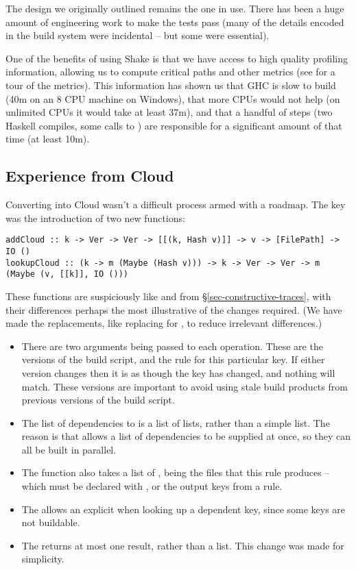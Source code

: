 The design we originally outlined remains the one in use. There has been a huge amount of engineering work to make the tests pass (many of the details encoded in the \Make build system were incidental -- but some were essential).

One of the benefits of using Shake is that we have access to high quality profiling information, allowing us to compute critical paths and other metrics (see \cite{mitchell2019ghcrebuildtimes} for a tour of the metrics). This information has shown us that GHC is slow to build (40m on an 8 CPU machine on Windows), that more CPUs would not help (on unlimited CPUs it would take at least 37m), and that a handful of steps (two Haskell compiles, some calls to ) are responsible for a significant amount of that time (at least 10m).

\subsection{Experience from Cloud \Shake}\label{sec-cloud-shake}

Converting \Shake into Cloud \Shake wasn't a difficult process armed with a roadmap. The key was the introduction of two new functions:

\begin{verbatim}
addCloud :: k -> Ver -> Ver -> [[(k, Hash v)]] -> v -> [FilePath] -> IO ()
lookupCloud :: (k -> m (Maybe (Hash v))) -> k -> Ver -> Ver -> m (Maybe (v, [[k]], IO ()))
\end{verbatim}

These functions are suspiciously like  and  from \S\ref{sec-constructive-traces}, with their differences perhaps the most illustrative of the changes required. (We have made the replacements, like replacing  for , to reduce irrelevant differences.)

\begin{itemize}
\item There are two  arguments being passed to each operation. These are the versions of the build script, and the rule for this particular key. If either version changes then it is as though the key has changed, and nothing will match. These versions are important to avoid using stale build products from previous versions of the build script.
\item The list of dependencies to  is a list of lists, rather than a simple list. The reason is that \Shake allows a list of dependencies to be supplied at once, so they can all be built in parallel.
\item The  function also takes a list of , being the files that this rule produces -- which must be declared with , or the output keys from a rule.
\item The  allows an explicit  when looking up a dependent key, since some keys are not buildable.
\item The  returns at most one result, rather than a list. This change was made for simplicity.
\end{itemize}

